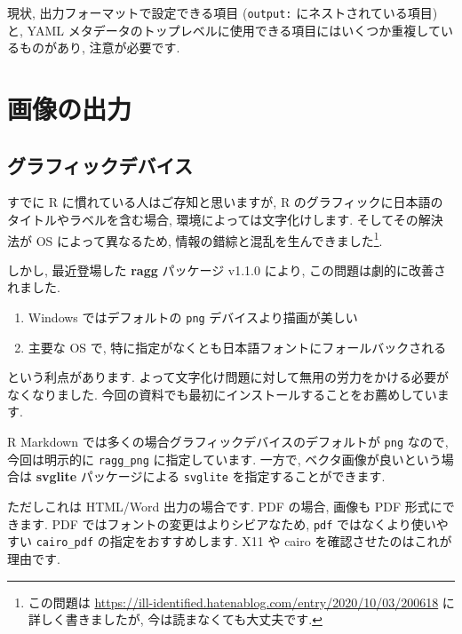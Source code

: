 \documentclass[
]{ltjsarticle}
\providecommand{\tightlist}{%
  \setlength{\itemsep}{0pt}\setlength{\parskip}{0pt}}
\begin{document}
現状, 出力フォーマットで設定できる項目 (\texttt{output:} にネストされている項目) と, YAML メタデータのトップレベルに使用できる項目にはいくつか重複しているものがあり, 注意が必要です.

\hypertarget{ux753bux50cfux306eux51faux529b}{%
\section{画像の出力}\label{ux753bux50cfux306eux51faux529b}}

\hypertarget{ux30b0ux30e9ux30d5ux30a3ux30c3ux30afux30c7ux30d0ux30a4ux30b9}{%
\subsection{グラフィックデバイス}\label{ux30b0ux30e9ux30d5ux30a3ux30c3ux30afux30c7ux30d0ux30a4ux30b9}}

すでに R に慣れている人はご存知と思いますが, R のグラフィックに日本語のタイトルやラベルを含む場合, 環境によっては文字化けします. そしてその解決法が OS によって異なるため, 情報の錯綜と混乱を生んできました\footnote{この問題は \url{https://ill-identified.hatenablog.com/entry/2020/10/03/200618} に詳しく書きましたが, 今は読まなくても大丈夫です.}.

しかし, 最近登場した \textbf{ragg} パッケージ v1.1.0 により, この問題は劇的に改善されました.

\begin{enumerate}
\def\labelenumi{\arabic{enumi}.}
\tightlist
\item
  Windows ではデフォルトの \texttt{png} デバイスより描画が美しい
\item
  主要な OS で, 特に指定がなくとも日本語フォントにフォールバックされる
\end{enumerate}

という利点があります. よって文字化け問題に対して無用の労力をかける必要がなくなりました. 今回の資料でも最初にインストールすることをお薦めしています.

R Markdown では多くの場合グラフィックデバイスのデフォルトが \texttt{png} なので, 今回は明示的に \texttt{ragg\_png} に指定しています. 一方で, ベクタ画像が良いという場合は \textbf{svglite} パッケージによる \texttt{svglite} を指定することができます.

ただしこれは HTML/Word 出力の場合です. PDF の場合, 画像も PDF 形式にできます. PDF ではフォントの変更はよりシビアなため, \texttt{pdf} ではなくより使いやすい \texttt{cairo\_pdf} の指定をおすすめします. X11 や cairo を確認させたのはこれが理由です.
\end{document}
